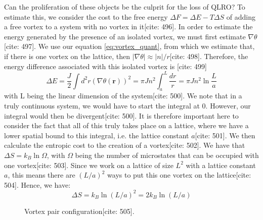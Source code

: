 \documentclass[11pt]{article}
\begin{document}
Can the proliferation of these objects be the culprit for the loss of QLRO? To estimate this, we consider the cost to the free energy $\Delta F = \Delta E - T \Delta S$ of adding a free vortex to a system with no vortex in it[cite: 496]. In order to estimate the energy generated by the presence of an isolated vortex, we must first estimate $\nabla \theta$[cite: 497]. We use our equation \eqref{eq:vortex_quant}, from which we estimate that, if there is one vortex on the lattice, then $|\nabla \theta| \approx |n|/r$[cite: 498]. Therefore, the energy difference associated with this isolated vortex is [cite: 499]
\begin{equation}
\Delta E = \frac{J}{2} \int d^2r (\nabla \theta(\mathbf{r}))^2 = \pi J n^2 \int_a^L \frac{dr}{r} = \pi J n^2 \ln \frac{L}{a} \label{eq:vortex_E}
\end{equation}
with L being the linear dimension of the system[cite: 500]. We note that in a truly continuous system, we would have to start the integral at 0. However, our integral would then be divergent[cite: 500]. It is therefore important here to consider the fact that all of this truly takes place on a lattice, where we have a lower spatial bound to this integral, i.e. the lattice constant $a$[cite: 501]. We then calculate the entropic cost to the creation of a vortex[cite: 502]. We have that $\Delta S = k_B \ln \Omega$, with $\Omega$ being the number of microstates that can be occupied with one vortex[cite: 503]. Since we work on a lattice of size $L^2$ with a lattice constant $a$, this means there are $(L/a)^2$ ways to put this one vortex on the lattice[cite: 504]. Hence, we have:
\begin{equation}
\Delta S = k_B \ln (L/a)^2 = 2 k_B \ln(L/a) \label{eq:vortex_S}
\end{equation}

\begin{figure}[h!]
    \centering
    \caption{Vortex pair configuration[cite: 505].}
    \label{fig:vortex_pair}
\end{figure}
\end{document}
